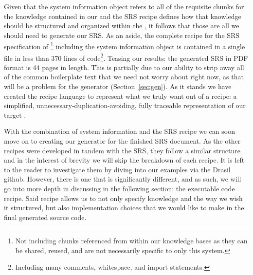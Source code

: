 
Given that the system information object refers to all of the requisite chunks 
for the knowledge contained in our \sfs{} and the SRS recipe defines how that 
knowledge should be structured and organized within the \sf{}, it follows that 
those are all we should need to generate our SRS. As an aside, the complete 
recipe for the SRS specification of \gb{}\footnote{Not including chunks 
referenced from within our knowledge bases as they can be shared, reused, and 
are not necessarily specific to only this system.} including the system 
information object is contained in a single file in less than 370 lines of 
code\footnote{Including many comments, whitespace, and import statements.}. 
Teasing our results: the generated SRS in PDF format is 44 pages in length. 
This is partially due to our ability to strip away all of the common 
boilerplate text that we need not worry about right now, as that will be a 
problem for the generator (Section~\ref{sec:gen}). As it stands we have created 
the recipe language to represent what we truly want out of a recipe: a 
simplified, unnecessary-duplication-avoiding, fully traceable representation of 
our target \sf{}.

With the combination of system information and the SRS recipe we can soon move
on to creating our generator for the finished SRS document. As the other \sf{} 
recipes were developed in tandem with the SRS, they follow a similar structure 
and in the interest of brevity we will skip the breakdown of each recipe. It is 
left to the reader to investigate them by diving into our examples via the 
Drasil github. However, there is one \sf{} that is significantly different, and 
as such, we will go into more depth in discussing in the following section: the 
executable code recipe. Said recipe allows us to not only specify knowledge and 
the way we wish it structured, but also implementation choices that we would 
like to make in the final generated source code.


